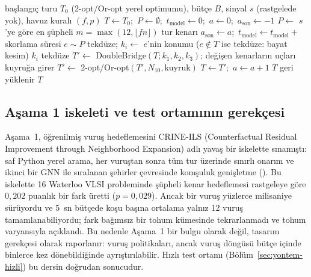 \begin{algorithm}[!htbp]
\caption{Hedefli hızlı ILS (bir strateji, bir (problem, tohum) çifti)}\label{alg:ils}
\begin{algorithmic}[1]
\Require başlangıç turu $T_0$ (2-opt/Or-opt yerel optimumu), bütçe $B$, sinyal $s$ (rastgelede yok), havuz kuralı $(f,p)$
\State $T\gets T_0$;\ $P\gets\emptyset$;\ $t_{\mathrm{model}}\gets0$;\ $a\gets0$;\ $a_{\mathrm{son}}\gets-1$ 
    \State $P\gets$ $s$'ye göre en şüpheli $m=\max(12,\lfloor fn\rfloor)$ tur kenarı 
    \State $a_{\mathrm{son}}\gets a$;\ $t_{\mathrm{model}}\gets t_{\mathrm{model}}+{}$skorlama süresi
  \EndIf
        \State $e\sim P$ tekdüze; $k_i\gets$ $e$'nin konumu ($e\notin T$ ise tekdüze: bayat kesim)
      \Else
        \State $k_i$ tekdüze
      \EndIf
    \EndFor
    \State $T'\gets$ DoubleBridge$(T;k_1,k_2,k_3)$; değişen kenarların uçları kuyruğa girer
    \State $T'\gets$ 2-opt/Or-opt$(T',N_{10},\text{kuyruk})$ 
     \State $T\gets T'$;\ $a\gets a+1$ \Else \State $T$ geri yüklenir \EndIf
  \EndFor
\EndWhile
\State \Return $T$
\end{algorithmic}
\end{algorithm}

\subsection{Aşama 1 iskeleti ve test ortamının gerekçesi}\label{sec:yontem-crine}

Aşama~1, öğrenilmiş vuruş hedeflemesini CRINE-ILS (Counterfactual Residual Improvement through Neighborhood Expansion) adlı yavaş bir iskelette sınamıştı: saf Python
yerel arama, her vuruştan sonra tüm tur üzerinde sınırlı onarım ve ikinci bir GNN ile sıralanan
şehirler çevresinde komşuluk genişletme (). Bu iskelette 16 Waterloo VLSI
probleminde şüpheli kenar hedeflemesi rastgeleye göre $0{,}202$ puanlık bir fark üretti
($p=0{,}029$). Ancak bir vuruş yüzlerce milisaniye sürüyordu ve 5~sn bütçede koşu başına ortalama
yalnız 12 vuruş tamamlanabiliyordu; fark bağımsız bir tohum kümesinde tekrarlanmadı ve tohum
varyansıyla açıklandı. Bu nedenle Aşama~1 bir bulgu olarak değil, tasarım gerekçesi olarak
raporlanır: vuruş politikaları, ancak vuruş döngüsü bütçe içinde binlerce kez dönebildiğinde
ayrıştırılabilir. Hızlı test ortamı (Bölüm~\ref{sec:yontem-hizli}) bu dersin doğrudan sonucudur.

